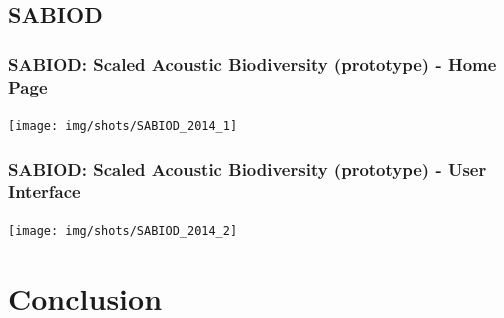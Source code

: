 \documentclass[10pt, final, hyperref, table]{beamer}
\begin{document}
\subsection{SABIOD}
\begin{frame}
  \frametitle{SABIOD: Scaled Acoustic Biodiversity (prototype) - Home Page}
  \begin{center}
    \texttt{[image: img/shots/SABIOD\_2014\_1]}
  \end{center}
\end{frame}

\begin{frame}
  \frametitle{SABIOD: Scaled Acoustic Biodiversity (prototype) - User Interface}
  \begin{center}
    \texttt{[image: img/shots/SABIOD\_2014\_2]}
  \end{center}
\end{frame}



\section{Conclusion}
\frame{\tableofcontents[currentsection]}
\end{document}
